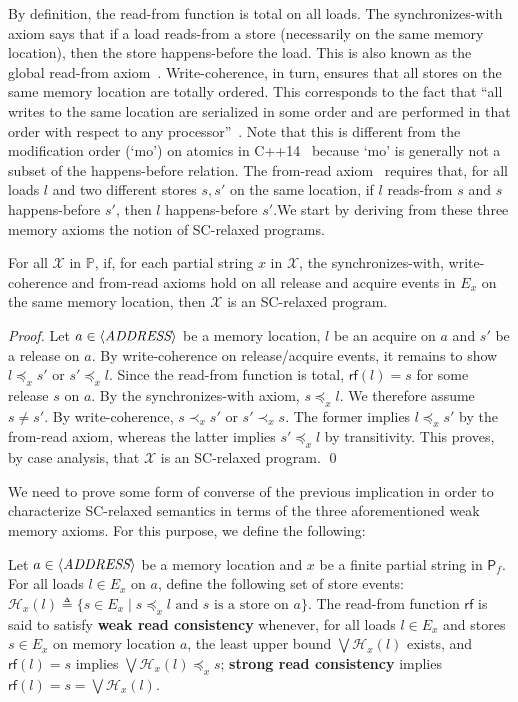\documentclass{llncs}
\newcommand{\set}[1]{\mbox{$\{ #1 \}$}}
\newcommand{\alt}{\mathrel{|}}
\newcommand{\deq}{\triangleq}
\newcommand{\sP}{\mathsf{P}}
\newcommand{\cH}{\mathcal{H}}
\newcommand{\cX}{\mathcal{X}}
\newcommand{\bbP}{\mathbb{P}}
\newcommand{\defn}[1]{\textbf{#1}}
\begin{document}
By definition, the read-from function is total on all loads. The synchronizes-with axiom says that if a load reads-from a store (necessarily on the same memory location), then the store happens-before the load. This is also known as the global read-from axiom~\cite{AMSS2012}. Write-coherence, in turn, ensures that all stores on the same memory location are totally ordered. This corresponds to the fact that ``all writes to the same location are serialized in some order and are performed in that order with respect to any processor''~\cite{GLLGGH1990}. Note that this is different from the modification order (`mo') on atomics in C++14~\cite{CPP14} because `mo' is generally not a subset of the happens-before relation. The from-read axiom~\cite{AMSS2012} requires that, for all loads $l$ and two different stores $s, s'$ on the same location, if $l$ reads-from $s$ and $s$ happens-before $s'$, then $l$ happens-before $s'$.We start by deriving from these three memory axioms the notion of SC-relaxed programs.


\begin{proposition}
\label{proposition:SC-relaxed-consistency}
For all $\cX$ in $\bbP$, if, for each partial string $x$ in $\cX$, the synchronizes-with, write-coherence and from-read axioms hold on all release and acquire events in $E_x$ on the same memory location, then $\cX$ is an SC-relaxed program.
\end{proposition}
\begin{proof}
Let $a \in \langle\textit{ADDRESS}\rangle$ be a memory location, $l$ be an acquire on $a$ and $s'$ be a release on $a$. By write-coherence on release/acquire events, it remains to show $l \preceq_x s'$ or $s' \preceq_x l$. Since the read-from function is total, $\mathsf{rf}(l) = s$ for some release $s$ on $a$. By the synchronizes-with axiom, $s \preceq_x l$. We therefore assume $s \not= s'$. By write-coherence, $s \prec_x s'$ or $s' \prec_x s$. The former implies $l \preceq_x s'$ by the from-read axiom, whereas the latter implies $s' \preceq_x l$ by transitivity. This proves, by case analysis, that $\cX$ is an SC-relaxed program. \qed
\end{proof}

We need to prove some form of converse of the previous implication in order to characterize SC-relaxed semantics in terms of the three aforementioned weak memory axioms. For this purpose, we define the following:

\begin{definition}
\label{def:read-consistency}
Let $a \in \langle\textit{ADDRESS}\rangle$ be a memory location and $x$ be a finite partial string in $\sP_f$. For all loads $l \in E_x$ on $a$, define the following set of store events: $\cH_x(l) \deq \set{s \in E_x \alt s \preceq_x l \text{ and } s \text{ is a store on } a}$. The read-from function $\mathsf{rf}$ is said to satisfy \defn{weak read consistency} whenever, for all loads $l \in E_x$ and stores $s \in E_x$ on memory location $a$, the least upper bound $\bigvee \cH_x(l)$ exists, and $\mathsf{rf}(l) = s$ implies $\bigvee \cH_x(l) \preceq_x s$; \defn{strong read consistency} implies $\mathsf{rf}(l) = s = \bigvee \cH_x(l)$.
\end{definition}
\end{document}
